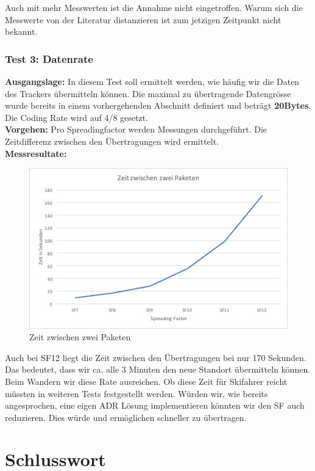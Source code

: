 \documentclass[11pt,english,german]{report}
\theoremstyle{definition}
\begin{document}
\noindent
Auch mit mehr Messwerten ist die Annahme nicht eingetroffen. Warum sich die Messwerte von der Literatur distanzieren ist zum jetzigen Zeitpunkt nicht bekannt.

\newpage
\subsection{Test 3: Datenrate}
\textbf{Ausgangslage:} In diesem Test soll ermittelt werden, wie häufig wir die Daten des Trackers übermitteln können. Die maximal zu übertragende Datengrösse wurde bereits in einem vorhergehenden Abschnitt definiert und beträgt \textbf{20Bytes}. Die Coding Rate wird auf 4/8 gesetzt.\\[0.3cm]
\textbf{Vorgehen:} Pro Spreadingfactor werden Messungen durchgeführt. Die Zeitdifferenz zwischen den Übertragungen wird ermittelt.\\[0.3cm]
\textbf{Messresultate:} 
\begin{figure}[H]
	\centering
	\includegraphics[width=\textwidth]{img/testing/timebetweenpakets.jpg}
	\caption[Zeit zwischen zwei Paketen]
	{Zeit zwischen zwei Paketen}
\end{figure}
\noindent
Auch bei SF12 liegt die Zeit zwischen den Übertragungen bei nur 170 Sekunden. Das bedeutet, dass wir ca. alle 3 Minuten den neue Standort übermitteln können. Beim Wandern wir diese Rate ausreichen. Ob diese Zeit für Skifahrer reicht müssten in weiteren Tests festgestellt werden. Würden wir, wie bereits angesprochen, eine eigen ADR Lösung implementieren könnten wir den SF auch reduzieren. Dies würde und ermöglichen schneller zu übertragen.

\chapter{Schlusswort}
\end{document}
